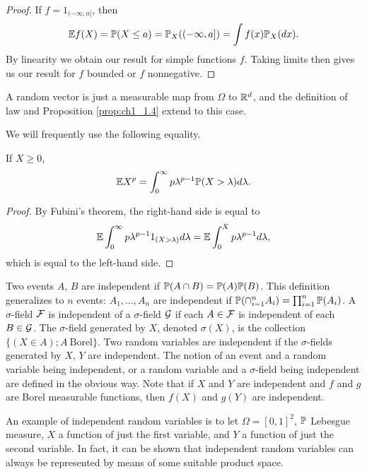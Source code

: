 \begin{proof}
If $f = 1_{(-\infty,a]}$, then
\begin{equation}\label{eq:ch1_1.3}
    \E f(X) = \P(X \leq a) = \P_X((-\infty,a]) = \int f(x)\P_X(dx).
\end{equation}
\mnewpage
By linearity we obtain our result for simple functions $f$. Taking limits then gives us our result for $f$ bounded or $f$ nonnegative.
\end{proof}

A random vector is just a measurable map from $\Omega$ to $\R^d$, and the definition of law and Proposition \ref{prop:ch1_1.4} extend to this case.

We will frequently use the following equality.

\begin{proposition}\label{prop:ch1_1.5}
If $X \geq 0$,
\begin{equation}\label{eq:ch1_1.4}
    \E X^p = \int_0^{\infty} p\lambda^{p-1}\P(X > \lambda)d\lambda.
\end{equation}
\end{proposition}

\begin{proof}
By Fubini's theorem, the right-hand side is equal to
\[
    \E\int_0^{\infty} p\lambda^{p-1}1_{(X>\lambda)}d\lambda = \E\int_0^X p\lambda^{p-1}d\lambda,
\]
which is equal to the left-hand side.
\end{proof}


Two events $A$, $B$ are independent if $\P(A \cap B) = \P(A)\P(B)$. This definition generalizes to $n$ events: $A_1,\ldots,A_n$ are independent if $\P(\cap_{i=1}^n A_i) = \prod_{i=1}^n \P(A_i)$. A $\sigma$-field $\FC$ is independent of a $\sigma$-field $\GC$ if each $A \in \FC$ is independent of each $B \in \GC$. The $\sigma$-field generated by $X$, denoted $\sigma(X)$, is the collection $\{(X \in A); A~\text{Borel}\}$. Two random variables are independent if the $\sigma$-fields generated by $X$, $Y$ are independent. The notion of an event and a random variable being independent, or a random variable and a $\sigma$-field being independent are defined in the obvious way. Note that if $X$ and $Y$ are independent and $f$ and $g$ are Borel measurable functions, then $f(X)$ and $g(Y)$ are independent.

An example of independent random variables is to let $\Omega = [0,1]^2$, $\P$ Lebesgue measure, $X$ a function of just the first variable, and $Y$ a function of just the second variable. In fact, it can be shown that independent random variables can always be represented by means of some suitable product space.

